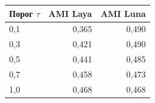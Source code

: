 \begin{tabular}{lrr}\toprule
Порог $\tau$ & AMI Laya & AMI Luna\\\midrule
0,1 & 0,365 & 0,490\\
0,3 & 0,421 & 0,490\\
0,5 & 0,441 & 0,485\\
0,7 & 0,458 & 0,473\\
1,0 & 0,468 & 0,468\\
\bottomrule\end{tabular}
